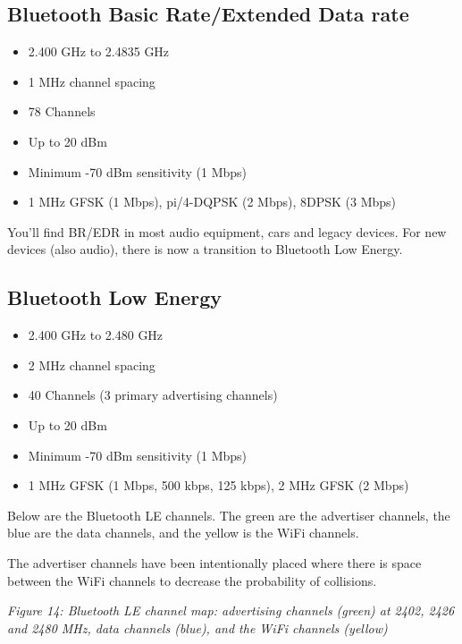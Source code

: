 \subsection{Bluetooth Basic Rate/Extended Data
rate}\label{bluetooth-basic-rateextended-data-rate}

\begin{itemize}
\tightlist
\item
  2.400 GHz to 2.4835 GHz
\item
  1 MHz channel spacing
\item
  78 Channels
\item
  Up to 20 dBm
\item
  Minimum -70 dBm sensitivity (1 Mbps)
\item
  1 MHz GFSK (1 Mbps), pi/4-DQPSK (2 Mbps), 8DPSK (3 Mbps)
\end{itemize}

You'll find BR/EDR in most audio equipment, cars and legacy devices. For
new devices (also audio), there is now a transition to Bluetooth Low
Energy.

\subsection{Bluetooth Low Energy}\label{bluetooth-low-energy}

\begin{itemize}
\tightlist
\item
  2.400 GHz to 2.480 GHz
\item
  2 MHz channel spacing
\item
  40 Channels (3 primary advertising channels)
\item
  Up to 20 dBm
\item
  Minimum -70 dBm sensitivity (1 Mbps)
\item
  1 MHz GFSK (1 Mbps, 500 kbps, 125 kbps), 2 MHz GFSK (2 Mbps)
\end{itemize}

Below are the Bluetooth LE channels. The green are the advertiser
channels, the blue are the data channels, and the yellow is the WiFi
channels.

The advertiser channels have been intentionally placed where there is
space between the WiFi channels to decrease the probability of
collisions.


{
\centering
{}
}

\emph{Figure 14: Bluetooth LE channel map: advertising channels (green)
at 2402, 2426 and 2480 MHz, data channels (blue), and the WiFi channels
(yellow)}

